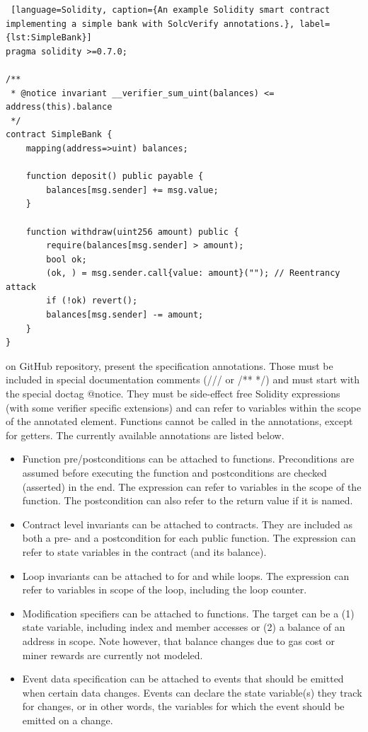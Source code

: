 \begin{lstlisting} [language=Solidity, caption={An example Solidity smart contract implementing a simple bank with SolcVerify annotations.}, label={lst:SimpleBank}]
pragma solidity >=0.7.0;

/**
 * @notice invariant __verifier_sum_uint(balances) <= address(this).balance
 */
contract SimpleBank {
    mapping(address=>uint) balances;

    function deposit() public payable {
        balances[msg.sender] += msg.value;
    }

    function withdraw(uint256 amount) public {
        require(balances[msg.sender] > amount);
        bool ok;
        (ok, ) = msg.sender.call{value: amount}(""); // Reentrancy attack
        if (!ok) revert();
        balances[msg.sender] -= amount;
    }
}
\end{lstlisting}

\citet{SolcVerify_3} on GitHub repository, present the specification annotations. Those must be included in special documentation comments (/// or /** */) and must start with the special doctag @notice. 
They must be side-effect free Solidity expressions (with some verifier specific extensions) and can refer to variables within the scope of the annotated element. Functions cannot be called in the annotations, except for getters.
The currently available annotations are listed below. 

\begin{itemize}
    \item Function pre/postconditions can be attached to functions. Preconditions are assumed before executing the function and postconditions are checked (asserted) in the end. The expression can refer to variables in the scope of the function. The postcondition can also refer to the return value if it is named.
    \item Contract level invariants can be attached to contracts. They are included as both a pre- and a postcondition for each public function. The expression can refer to state variables in the contract (and its balance).
    \item Loop invariants can be attached to for and while loops. The expression can refer to variables in scope of the loop, including the loop counter.
    \item Modification specifiers can be attached to functions. The target can be a (1) state variable, including index and member accesses or (2) a balance of an address in scope. Note however, that balance changes due to gas cost or miner rewards are currently not modeled.
    \item Event data specification can be attached to events that should be emitted when certain data changes. 
    Events can declare the state variable(s) they track for changes, or in other words, the variables for which the event should be emitted on a change.
\end{itemize}

